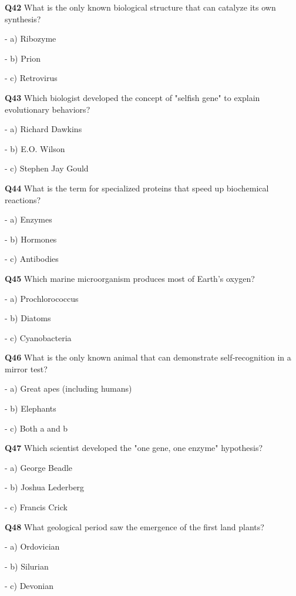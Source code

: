 \textbf{Q42} What is the only known biological structure that can catalyze its own synthesis?\par
\quad - a) Ribozyme\par
\quad - b) Prion\par
\quad - c) Retrovirus\par

\textbf{Q43} Which biologist developed the concept of "selfish gene" to explain evolutionary behaviors?\par
\quad - a) Richard Dawkins\par
\quad - b) E.O. Wilson\par
\quad - c) Stephen Jay Gould\par

\textbf{Q44} What is the term for specialized proteins that speed up biochemical reactions?\par
\quad - a) Enzymes\par
\quad - b) Hormones\par
\quad - c) Antibodies\par

\textbf{Q45} Which marine microorganism produces most of Earth's oxygen?\par
\quad - a) Prochlorococcus\par
\quad - b) Diatoms\par
\quad - c) Cyanobacteria\par

\textbf{Q46} What is the only known animal that can demonstrate self‑recognition in a mirror test?\par
\quad - a) Great apes (including humans)\par
\quad - b) Elephants\par
\quad - c) Both a and b\par

\textbf{Q47} Which scientist developed the "one gene, one enzyme" hypothesis?\par
\quad - a) George Beadle\par
\quad - b) Joshua Lederberg\par
\quad - c) Francis Crick\par

\textbf{Q48} What geological period saw the emergence of the first land plants?\par
\quad - a) Ordovician\par
\quad - b) Silurian\par
\quad - c) Devonian\par

